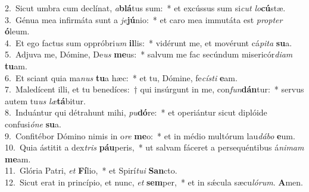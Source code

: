 {2.~}Sicut umbra cum declínat, \textit{a}\textbf{blá}tus sum:~* et excússus sum si\textit{cut} \textit{lo}\textbf{cú}stæ.\\
{3.~}Génua mea infirmáta sunt a \textit{je}\textbf{jú}nio:~* et caro mea immutáta est \textit{prop}\textit{ter} \textbf{ó}leum.\\
{4.~}Et ego factus sum oppróbri\textit{um} \textbf{il}lis:~* vidérunt me, et movérunt cá\textit{pi}\textit{ta} \textbf{su}a.\\
{5.~}Adjuva me, Dómine, De\textit{us} \textbf{me}us:~* salvum me fac secúndum misericór\textit{di}\textit{am} \textbf{tu}am.\\
{6.~}Et sciant quia ma\textit{nus} \textbf{tu}a hæc:~* et tu, Dómine, fe\textit{cí}\textit{sti} \textbf{e}am.\\
{7.~}Maledícent illi, et tu benedíces:~† qui insúrgunt in me, con\textit{fun}\textbf{dán}tur:~* servus autem tu\textit{us} \textit{læ}\textbf{tá}bitur.\\
{8.~}Induántur qui détrahunt mihi, \textit{pu}\textbf{dó}re:~* et operiántur sicut diplóide confusi\textit{ó}\textit{ne} \textbf{su}a.\\
{9.~}Confitébor Dómino nimis in o\textit{re} \textbf{me}o:~* et in médio multórum lau\textit{dá}\textit{bo} \textbf{e}um.\\
{10.~}Quia ástitit a dex\textit{tris} \textbf{páu}peris,~* ut salvam fáceret a persequéntibus á\textit{ni}\textit{mam} \textbf{me}am.\\
{11.~}Glória Patri, \textit{et} \textbf{Fí}lio,~* et Spirí\textit{tu}\textit{i} \textbf{San}cto.\\
{12.~}Sicut erat in princípio, et nunc, \textit{et} \textbf{sem}per,~* et in sǽcula sæcu\textit{ló}\textit{rum}. \textbf{A}men.\\
